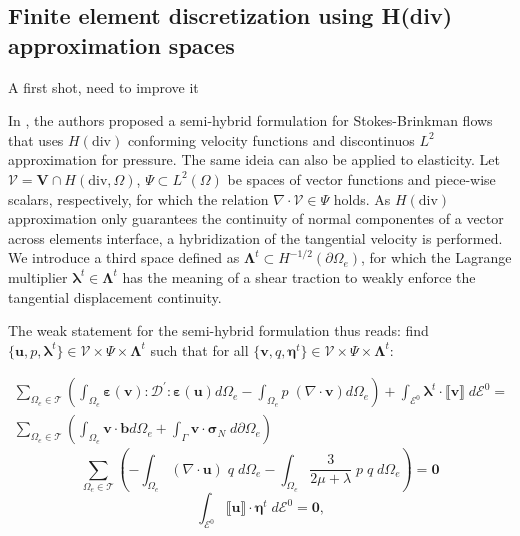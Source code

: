 \documentclass[english,11pt,3p,number,sort&compress]{elsarticle}
\newcommand{\giovane}{\color{red}{\bf\Large GA} \color{cyan} }
\begin{document}
\subsection{Finite element discretization using H(div) approximation spaces}
{\giovane A first shot, need to improve it}

In \cite{carvalho2024semi}, the authors proposed a semi-hybrid formulation for Stokes-Brinkman flows that uses $H(\text{div})$ conforming velocity functions and discontinuos $L^2$ approximation for pressure. The same ideia can also be applied to elasticity. Let $\mathcal{V} = \mathbf{V}\cap H(\text{div},\Omega)$, $\Psi \subset L^2(\Omega)$ be spaces of vector functions and piece-wise scalars, respectively, for which the relation $\nabla \cdot \mathcal{V} \in \Psi$ holds. As $H(\text{div})$ approximation only guarantees the continuity of normal componentes of a vector across elements interface, a hybridization of the tangential velocity is performed. We introduce a third space defined as $\boldsymbol{\Lambda}^t \subset H^{-1/2}(\partial\Omega_e)$, for which the Lagrange multiplier $\boldsymbol{\lambda}^t \in \boldsymbol{\Lambda}^t$ has the meaning of a shear traction to weakly enforce the tangential displacement continuity. 

The weak statement for the semi-hybrid formulation thus reads: find $\{\mathbf{u},p,\boldsymbol{\lambda}^t\} \in \mathcal{V} \times \Psi \times \boldsymbol{\Lambda}^t$ such that for all $\{\mathbf{v},q,\boldsymbol{\eta}^t\} \in \mathcal{V}\times \Psi \times \boldsymbol{\Lambda}^t$:

\begin{equation} \label{eq:semihybrid1}
    \begin{split}
        \sum_{\Omega_e \in \mathcal{T}} \left( \int_{\Omega_e} \boldsymbol{\varepsilon}(\mathbf{v}) : \mathcal{D}^{'} : \boldsymbol{\varepsilon}(\mathbf{u}) d\Omega_e - \int_{\Omega_e} p\; (\nabla \cdot \mathbf{v}) d\Omega_e \right) + \int_{\mathcal{E}^0} \boldsymbol{\lambda}^t \cdot \llbracket \mathbf{v} \rrbracket \;d\mathcal{E}^0 = \\ \sum_{\Omega_e \in \mathcal{T}} \left( \int_{\Omega_e} \mathbf{v} \cdot \mathbf{b} d\Omega_e + \int_{\Gamma} \mathbf{v} \cdot \boldsymbol{\sigma}_N \; d\partial\Omega_e \right)
    \end{split}
\end{equation}
\begin{equation} \label{eq:semihybrid2}
    \sum_{\Omega_e \in \mathcal{T}} \left(-\int_{\Omega_e} (\nabla \cdot \mathbf{u}) \;q\; d\Omega_e -\int_{\Omega_e} \frac{3}{2\mu+\lambda}\;p\; q\; d\Omega_e \right) = \mathbf{0}
\end{equation}
\begin{equation} \label{eq:semihybrid3}
    \int_{\mathcal{E}^0} \llbracket \mathbf{u} \rrbracket \cdot \mathbf{\eta}^t \;d\mathcal{E}^0 = \mathbf{0} \text{,}
\end{equation}
\end{document}
